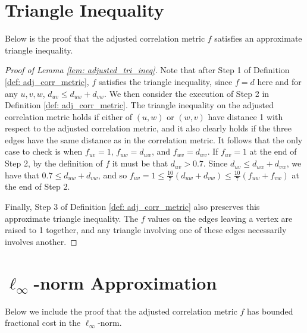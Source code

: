 \section{Triangle Inequality} \label{sec: tri_ineq}

Below is the proof that the adjusted correlation metric $f$ satisfies an approximate triangle inequality. 

\begin{proof}[Proof of Lemma \ref{lem: adjusted_tri_ineq}]
    Note that after Step 1 of Definition \ref{def: adj_corr_metric}, $f$ satisfies the triangle inequality, since $f=d$ here and for any $u,v,w$, $d_{uv} \leq d_{uw}+d_{vw}.$
    We then consider the execution of Step 2 in Definition \ref{def: adj_corr_metric}.
    The triangle inequality on the adjusted correlation metric holds if either of $(u,w)$ or $(w,v)$ have distance 1 with respect to the adjusted correlation metric, and it also clearly holds if the three edges have the same distance as in the correlation metric. 
    It follows that the only case to check is when $f_{uv}=1$, $f_{uw}=d_{uw}$, and $f_{wv}=d_{wv}$.
    If $f_{uv}=1$ at the end of Step 2, by the definition of $f$ it must be that $d_{uv} > 0.7$.
    Since $d_{uv} \leq d_{uw}+d_{vw}$, we have that $0.7 \leq d_{uw}+d_{vw}$, 
    and so $f_{uv}=1 \leq \frac{10}{7}(d_{uw}+d_{vw}) \leq \frac{10}{7}(f_{uw}+f_{vw})$ at the end of Step 2.
    
    Finally, Step 3 of Definition \ref{def: adj_corr_metric} also preserves this approximate triangle inequality. 
    The $f$ values on the edges leaving a vertex are raised to 1 together, and any triangle involving one of these edges necessarily involves another.
\end{proof}

\section{$\ell_{\infty}$-norm Approximation} \label{sec: infty_norm}
Below we include the proof that the adjusted correlation metric $f$ has bounded fractional cost in the $\ell_{\infty}$-norm. 

